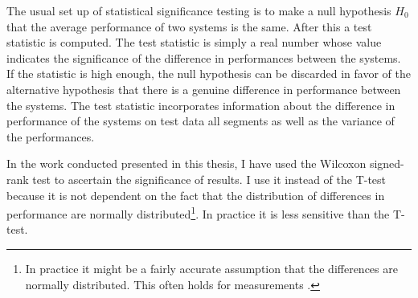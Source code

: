 The usual set up of statistical significance testing is to make a null
hypothesis $H_0$ that the average performance of two systems is the
same. After this a test statistic is computed. The test statistic is
simply a real number whose value indicates the significance of the
difference in performances between the systems. If the statistic is
high enough, the null hypothesis can be discarded in favor of the
alternative hypothesis that there is a genuine difference in
performance between the systems. The test statistic incorporates
information about the difference in performance of the systems on test
data all segments as well as the variance of the performances.

In the work conducted presented in this thesis, I have used the
Wilcoxon signed-rank test \cite{?} to ascertain the significance of
results. I use it instead of the T-test because it is not dependent on
the fact that the distribution of differences in performance are
normally distributed\footnote{In practice it might be a fairly
  accurate assumption that the differences are normally
  distributed. This often holds for measurements \cite{?}.}. In
practice it is less sensitive than the T-test.

